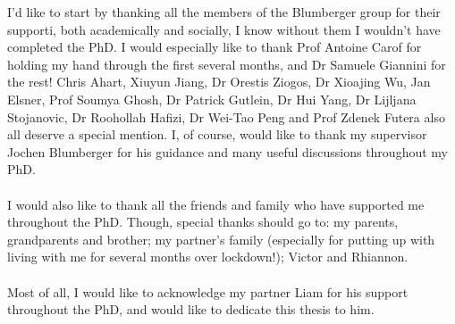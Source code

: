 \begin{acknowledgements}
I'd like to start by thanking all the members of the Blumberger group for their supporti, both academically and socially, I know without them I wouldn't have completed the PhD. I would especially like to thank Prof Antoine Carof for holding my hand through the first several months, and Dr Samuele Giannini for the rest! Chris Ahart, Xiuyun Jiang, Dr Orestis Ziogos, Dr Xioajing Wu, Jan Elsner, Prof Soumya Ghosh, Dr Patrick Gutlein, Dr Hui Yang, Dr Lijljana Stojanovic, Dr Roohollah Hafizi, Dr Wei-Tao Peng and Prof Zdenek Futera also all deserve a special mention. I, of course, would like to thank my supervisor Jochen Blumberger for his guidance and many useful discussions throughout my PhD.
\\\\
I would also like to thank all the friends and family who have supported me throughout the PhD. Though, special thanks should go to: my parents, grandparents and brother; my partner's family (especially for putting up with living with me for several months over lockdown!); Victor and Rhiannon.
\\\\
Most of all, I would like to acknowledge my partner Liam for his support throughout the PhD, and would like to dedicate this thesis to him.
\end{acknowledgements}

\setcounter{tocdepth}{2} 

\tableofcontents
\listoffigures
\listoftables

